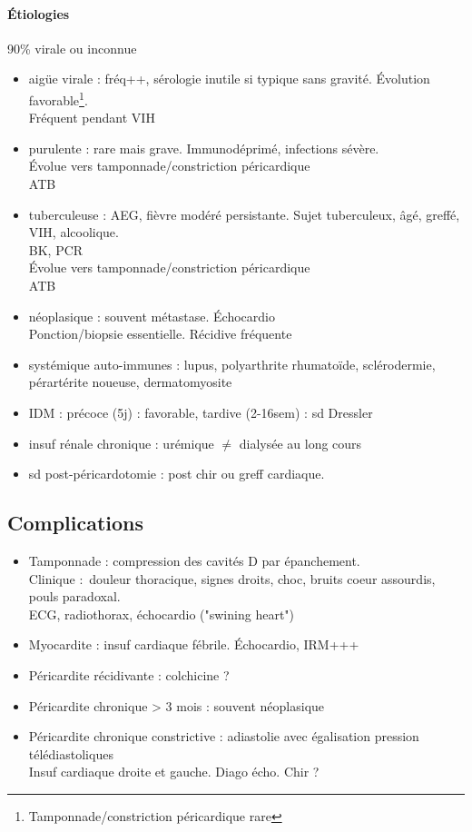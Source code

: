 \documentclass{article}
\begin{document}
\paragraph{Étiologies} 90\% virale ou inconnue
\begin{itemize}
  \item aigüe virale : fréq++, sérologie inutile si typique sans gravité.
    Évolution favorable\footnote{Tamponnade/constriction péricardique rare}.\\
    Fréquent pendant VIH
  \item purulente : rare mais grave. Immunodéprimé, infections sévère.\\
    Évolue vers tamponnade/constriction péricardique\\
    ATB
  \item tuberculeuse : AEG, fièvre modéré persistante. Sujet tuberculeux, âgé,
    greffé, VIH, alcoolique.\\
    BK, PCR\\
    Évolue vers tamponnade/constriction péricardique\\
    ATB
  \item néoplasique : souvent métastase. Échocardio\\
    Ponction/biopsie essentielle. Récidive fréquente
  \item systémique auto-immunes : lupus, polyarthrite rhumatoïde, sclérodermie,
    pérartérite noueuse, dermatomyosite
  \item IDM : précoce (5j) : favorable, tardive (2-16sem) : sd Dressler
  \item insuf rénale chronique : urémique $\ne$ dialysée au long cours
  \item sd post-péricardotomie : post chir ou greff cardiaque.
\end{itemize}

\subsection{Complications}
\begin{itemize}
  \item Tamponnade : compression des cavités D par épanchement.\\
    Clinique : douleur thoracique, signes droits, choc, bruits coeur assourdis,
    pouls paradoxal. \\
    ECG, radiothorax, échocardio ("swining heart")
  \item Myocardite : insuf cardiaque fébrile. Échocardio, IRM+++
  \item Péricardite récidivante : colchicine ?
  \item Péricardite chronique > 3 mois : souvent néoplasique
  \item Péricardite chronique constrictive : adiastolie avec égalisation
    pression télédiastoliques\\
    Insuf cardiaque droite et gauche. Diago écho. Chir ?
\end{itemize}
\end{document}
